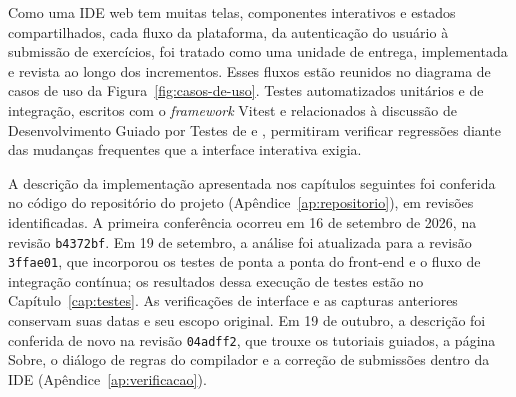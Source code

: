 Como uma IDE web tem muitas telas, componentes interativos e estados compartilhados, cada fluxo da plataforma, da autenticação do usuário à submissão de exercícios, foi tratado como uma unidade de entrega, implementada e revista ao longo dos incrementos. Esses fluxos estão reunidos no diagrama de casos de uso da Figura~\ref{fig:casos-de-uso}. Testes automatizados unitários e de integração, escritos com o \textit{framework} Vitest e relacionados à discussão de Desenvolvimento Guiado por Testes de  e , permitiram verificar regressões diante das mudanças frequentes que a interface interativa exigia.

A descrição da implementação apresentada nos capítulos seguintes foi conferida no código do repositório do projeto (Apêndice~\ref{ap:repositorio}), em revisões identificadas. A primeira conferência ocorreu em 16 de setembro de 2026, na revisão \texttt{b4372bf}. Em 19 de setembro, a análise foi atualizada para a revisão \texttt{3ffae01}, que incorporou os testes de ponta a ponta do front-end e o fluxo de integração contínua; os resultados dessa execução de testes estão no Capítulo~\ref{cap:testes}. As verificações de interface e as capturas anteriores conservam suas datas e seu escopo original. Em 19 de outubro, a descrição foi conferida de novo na revisão \texttt{04adff2}, que trouxe os tutoriais guiados, a página Sobre, o diálogo de regras do compilador e a correção de submissões dentro da IDE (Apêndice~\ref{ap:verificacao}).



